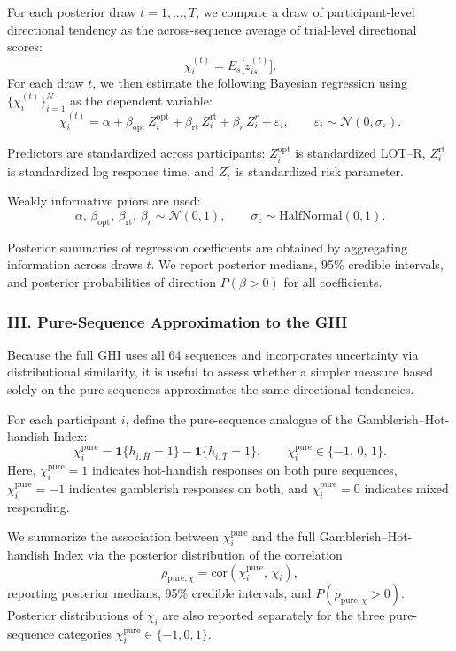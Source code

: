 \documentclass[11pt,a4paper]{article}
\numberwithin{equation}{section}
\begin{document}
For each posterior draw \(t=1,\dots,T\), we compute a draw of participant-level
directional tendency as the across-sequence average of trial-level directional
scores:
\[
\chi_i^{(t)} = E_s\!\big[z_{is}^{(t)}\big].
\]
For each draw \(t\), we then estimate the following Bayesian regression using
\(\{\chi_i^{(t)}\}_{i=1}^N\) as the dependent variable:
\[
\chi_i^{(t)}
= \alpha
+ \beta_{\mathrm{opt}}\, Z_i^{\mathrm{opt}}
+ \beta_{\mathrm{rt}}\, Z_i^{\mathrm{rt}}
+ \beta_{r}\, Z_i^{r}
+ \varepsilon_i,
\qquad
\varepsilon_i \sim \mathcal{N}(0,\sigma_{\varepsilon}).
\]

Predictors are standardized across participants:
\(Z_i^{\mathrm{opt}}\) is standardized LOT--R,
\(Z_i^{\mathrm{rt}}\) is standardized log response time, and
\(Z_i^{r}\) is standardized risk parameter.

Weakly informative priors are used:
\[
\alpha,\,\beta_{\mathrm{opt}},\,\beta_{\mathrm{rt}},\,\beta_r \sim \mathcal{N}(0,1),
\qquad
\sigma_{\varepsilon} \sim \mathrm{HalfNormal}(0,1).
\]

Posterior summaries of regression coefficients are obtained by aggregating
information across draws \(t\). We report posterior medians, 95\% credible
intervals, and posterior probabilities of direction \(P(\beta>0)\) for all
coefficients.
\subsubsection*{III. Pure-Sequence Approximation to the GHI}
\label{Sec:Ex1.3}

Because the full GHI uses all 64 sequences and incorporates uncertainty via 
distributional similarity, it is useful to assess whether a simpler measure based 
solely on the pure sequences approximates the same directional tendencies.

For each participant \(i\), define the pure-sequence analogue of the 
Gamblerish--Hot-handish Index:
\[
\chi_i^{\text{pure}}
= \mathbf{1}\{h_{i,\bar{H}} = 1\}
- \mathbf{1}\{h_{i,\bar{T}} = 1\},
\qquad
\chi_i^{\text{pure}} \in \{-1,\,0,\,1\}.
\]
Here, \(\chi_i^{\text{pure}} = 1\) indicates hot-handish responses on both pure 
sequences, \(\chi_i^{\text{pure}} = -1\) indicates gamblerish responses on both, 
and \(\chi_i^{\text{pure}} = 0\) indicates mixed responding.

We summarize the association between \(\chi_i^{\text{pure}}\) and the full 
Gamblerish--Hot-handish Index via the posterior distribution of the correlation
\[
\rho_{\text{pure},\chi} = \mathrm{cor}(\chi_i^{\text{pure}},\, \chi_i),
\]
reporting posterior medians, 95\% credible intervals, and 
\(P(\rho_{\text{pure},\chi} > 0)\). Posterior distributions of \(\chi_i\) are also 
reported separately for the three pure-sequence categories 
\(\chi_i^{\text{pure}} \in \{-1,0,1\}\).
\end{document}
